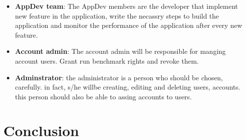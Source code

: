 \begin{itemize}
  \item{\textbf{AppDev team}}: The AppDev members are the developer that implement new
    feature in the application, write the necassry steps to build the
    application and monitor the performance of the application after every new
    feature.
  \item{\textbf{Account admin}}: The account admin will be responsible for manging
    account users. Grant run benchmark rights and revoke them.
  \item{\textbf{Adminstrator}}: the administrator is a person who should be chosen,
    carefully. in fact, s/he willbe creating, editing and deleting users,
    accounts. this person should also be able to assing accounts to users.
\end{itemize}


\section*{Conclusion}
